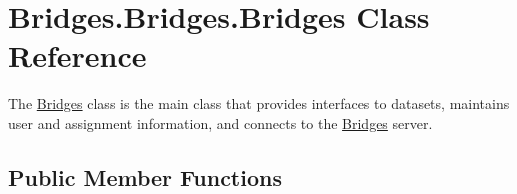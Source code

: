 \hypertarget{class_bridges_1_1_bridges_1_1_bridges}{}\section{Bridges.\+Bridges.\+Bridges Class Reference}
\label{class_bridges_1_1_bridges_1_1_bridges}


The \hyperlink{class_bridges_1_1_bridges_1_1_bridges}{Bridges} class is the main class that provides interfaces to datasets, maintains user and assignment information, and connects to the \hyperlink{class_bridges_1_1_bridges_1_1_bridges}{Bridges} server.  


\subsection*{Public Member Functions}
